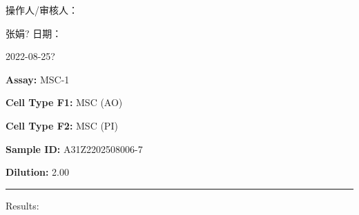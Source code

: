 \documentclass[UTF8,10pt,a4paper,fontset=fandol]{ctexart}
\newcommand{\fieldvalue}[1]{#1}
\newcommand{\handwritten}[1]{#1}
\begin{document}
\vfill

\noindent 操作人/审核人：

\fieldvalue{\handwritten{张娟?}}
\hfill
日期：

\fieldvalue{\handwritten{2022-08-25?}}

\newpage

\noindent\textbf{Assay:} %
\fieldvalue{MSC-1}

\vspace{0.5em}

\noindent\textbf{Cell Type F1:} %
\fieldvalue{MSC (AO)}

\noindent\textbf{Cell Type F2:} %
\fieldvalue{MSC (PI)}

\vspace{0.5em}

\noindent\textbf{Sample ID:} %
\fieldvalue{A31Z2202508006-7}

\noindent\textbf{Dilution:} %
\fieldvalue{2.00}

\vspace{0.5em}
\hrule
\vspace{0.5em}

\noindent Results:

\vspace{0.5em}
\end{document}
